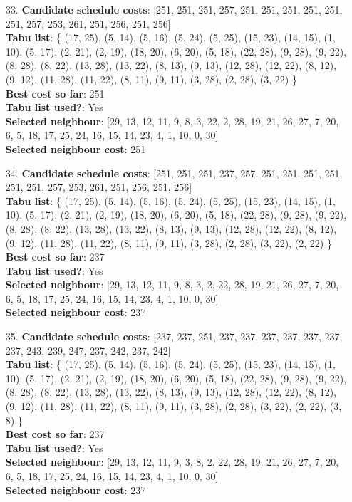 \documentclass[fleqn]{article}
\begin{document}
\begin{itemize}
    \item[33.] \textbf{Candidate schedule costs}: [251, 251, 251, 257, 251, 251, 251, 251, 251, 251, 257, 253, 261, 251, 256, 251, 256] \\
    \textbf{Tabu list}: \{ (17, 25), (5, 14), (5, 16), (5, 24), (5, 25), (15, 23), (14, 15), (1, 10), (5, 17), (2, 21), (2, 19), (18, 20), (6, 20), (5, 18), (22, 28), (9, 28), (9, 22), (8, 28), (8, 22), (13, 28), (13, 22), (8, 13), (9, 13), (12, 28), (12, 22), (8, 12), (9, 12), (11, 28), (11, 22), (8, 11), (9, 11), (3, 28), (2, 28), (3, 22) \} \\
    \textbf{Best cost so far}: 251 \\
    \textbf{Tabu list used?}: Yes \\
    \textbf{Selected neighbour}: [29, 13, 12, 11, 9, 8, 3, 22, 2, 28, 19, 21, 26, 27, 7, 20, 6, 5, 18, 17, 25, 24, 16, 15, 14, 23, 4, 1, 10, 0, 30] \\
    \textbf{Selected neighbour cost}: 251
      

    \item[34.] \textbf{Candidate schedule costs}: [251, 251, 251, 237, 257, 251, 251, 251, 251, 251, 251, 257, 253, 261, 251, 256, 251, 256] \\
    \textbf{Tabu list}: \{ (17, 25), (5, 14), (5, 16), (5, 24), (5, 25), (15, 23), (14, 15), (1, 10), (5, 17), (2, 21), (2, 19), (18, 20), (6, 20), (5, 18), (22, 28), (9, 28), (9, 22), (8, 28), (8, 22), (13, 28), (13, 22), (8, 13), (9, 13), (12, 28), (12, 22), (8, 12), (9, 12), (11, 28), (11, 22), (8, 11), (9, 11), (3, 28), (2, 28), (3, 22), (2, 22) \} \\
    \textbf{Best cost so far}: 237 \\
    \textbf{Tabu list used?}: Yes \\
    \textbf{Selected neighbour}: [29, 13, 12, 11, 9, 8, 3, 2, 22, 28, 19, 21, 26, 27, 7, 20, 6, 5, 18, 17, 25, 24, 16, 15, 14, 23, 4, 1, 10, 0, 30] \\
    \textbf{Selected neighbour cost}: 237
      

    \item[35.] \textbf{Candidate schedule costs}: [237, 237, 251, 237, 237, 237, 237, 237, 237, 237, 243, 239, 247, 237, 242, 237, 242] \\
    \textbf{Tabu list}: \{ (17, 25), (5, 14), (5, 16), (5, 24), (5, 25), (15, 23), (14, 15), (1, 10), (5, 17), (2, 21), (2, 19), (18, 20), (6, 20), (5, 18), (22, 28), (9, 28), (9, 22), (8, 28), (8, 22), (13, 28), (13, 22), (8, 13), (9, 13), (12, 28), (12, 22), (8, 12), (9, 12), (11, 28), (11, 22), (8, 11), (9, 11), (3, 28), (2, 28), (3, 22), (2, 22), (3, 8) \} \\
    \textbf{Best cost so far}: 237 \\
    \textbf{Tabu list used?}: Yes \\
    \textbf{Selected neighbour}: [29, 13, 12, 11, 9, 3, 8, 2, 22, 28, 19, 21, 26, 27, 7, 20, 6, 5, 18, 17, 25, 24, 16, 15, 14, 23, 4, 1, 10, 0, 30] \\
    \textbf{Selected neighbour cost}: 237
      


\end{itemize}
\end{document}
